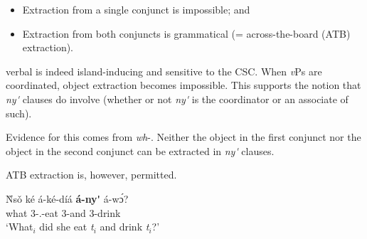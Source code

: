 \documentclass[output=paper
,newtxmath
,modfonts
,nonflat]{langsci/langscibook}
\begin{document}
\begin{itemize}
\item Extraction from a single conjunct is impossible; and
\item Extraction from both conjuncts is grammatical (= across-the-board (ATB) extraction).
\end{itemize}

\noindent {} verbal  is indeed island-inducing and sensitive to the CSC. When \textit{v}Ps are coordinated, object extraction becomes impossible. This supports the notion that \textit{ny\'{\textturnv}\ng} clauses do involve  (whether or not \textit{ny\'{\textturnv}\ng} is the coordinator or an associate of such).

Evidence for this comes from \textit{wh}-. Neither the object in the first conjunct nor the object in the second conjunct can be extracted in \textit{ny\'{\textturnv}\ng} clauses.

\ea\label{ex:duncan-et-al:13}
\z
\z

\noindent ATB extraction is, however, permitted.

\ea\label{ex:duncan-et-al:14}
\gll \`{N}s\v{o} k\'{e} \'{a}-k\'{e}-d\'{i}\'{a} \textbf{\'{a}-ny\'{\textturnv}\ng} \'{a}-\ng w\'ɔ\ng? \\
what {\foc} 3{\sg-\pst.\foc}-eat 3{\sg}-and 3{\sg}-drink \\
\glt `What$_i$ did she eat \textit{t}$_i$ and drink \textit{t}$_i$?'
\z
\end{document}
